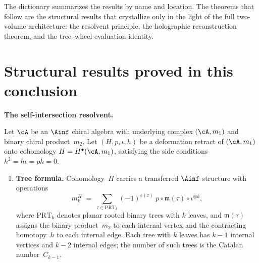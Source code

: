\medskip

The dictionary summarizes the results by name and location.
The theorems that follow are the structural results that
crystallize only in the light of the full two-volume architecture:
the resolvent principle, the holographic reconstruction theorem,
and the tree--wheel evaluation identity.

\section*{Structural results proved in this conclusion}

\noindent\textbf{The self-intersection resolvent.}


\begin{theorem}
\label{thm:resolvent-principle}
Let\/ $\cA$ be an\/ $\Ainf$ chiral algebra with underlying
complex\/ $(\cA, m_1)$ and binary chiral product\/~$m_2$.
Let\/ $(H, p, \iota, h)$ be a deformation retract of\/
$(\cA, m_1)$ onto cohomology\/
$H = H^\bullet(\cA, m_1)$, satisfying the side conditions
$h^2 = h\iota = ph = 0$.
\begin{enumerate}[label=\textup{(\roman*)}]
\item \textbf{Tree formula.}
 Cohomology~$H$ carries a transferred\/ $\Ainf$ structure
 with operations
 \begin{equation}
 \label{eq:resolvent-tree-formula}
 m_k^H
 \;=\;
 \sum_{\tau \in \mathrm{PRT}_k}
 (-1)^{\varepsilon(\tau)}\;
 p \circ \mathfrak{m}(\tau) \circ \iota^{\otimes k},
 \end{equation}
 where\/ $\mathrm{PRT}_k$ denotes planar rooted binary trees
 with\/ $k$ leaves, and\/ $\mathfrak{m}(\tau)$ assigns the binary
 product~$m_2$ to each internal vertex and the contracting
 homotopy~$h$ to each internal edge.
 Each tree with\/ $k$ leaves has\/ $k{-}1$ internal vertices
 and\/ $k{-}2$ internal edges; the number of such trees is
 the Catalan number\/~$C_{k-1}$.


\end{enumerate}
\end{theorem}
